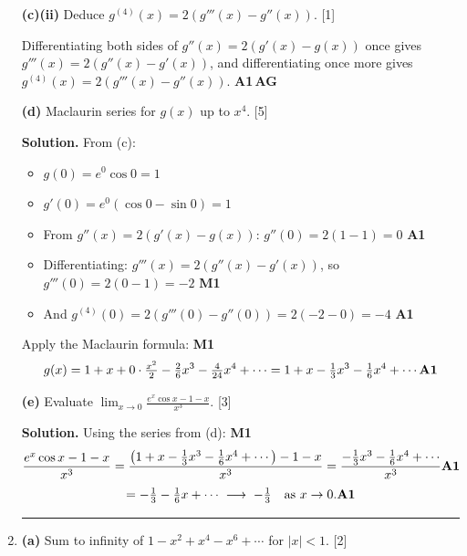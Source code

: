 \documentclass[12pt, twoside]{article}
\begin{document}
\begin{enumerate}[itemsep=0.3cm]
\medskip

\textbf{(c)(ii)} Deduce $g^{(4)}(x) = 2(g'''(x) - g''(x))$. \hfill [1]

Differentiating both sides of $g''(x) = 2(g'(x) - g(x))$ once gives
$g'''(x) = 2(g''(x) - g'(x))$, and differentiating once more gives
$g^{(4)}(x) = 2(g'''(x) - g''(x))$. \hfill \textbf{A1\,AG}

\medskip

\textbf{(d)} Maclaurin series for $g(x)$ up to $x^4$. \hfill [5]

\textbf{Solution.} From (c):
\begin{itemize}\setlength\itemsep{0.1em}
  \item $g(0) = e^0 \cos 0 = 1$
  \item $g'(0) = e^0(\cos 0 - \sin 0) = 1$
  \item From $g''(x) = 2(g'(x) - g(x))$: $g''(0) = 2(1 - 1) = 0$
    \hfill \textbf{A1}
  \item Differentiating: $g'''(x) = 2(g''(x) - g'(x))$, so
    $g'''(0) = 2(0 - 1) = -2$ \hfill \textbf{M1}
  \item And $g^{(4)}(0) = 2(g'''(0) - g''(0)) = 2(-2 - 0) = -4$
    \hfill \textbf{A1}
\end{itemize}
Apply the Maclaurin formula: \hfill \textbf{M1}
\[
g(x) = 1 + x + 0 \cdot \tfrac{x^2}{2} - \tfrac{2}{6}x^3 - \tfrac{4}{24}x^4
+ \cdots = 1 + x - \tfrac{1}{3}x^3 - \tfrac{1}{6}x^4 + \cdots
\hfill \textbf{A1}
\]

\medskip

\textbf{(e)} Evaluate
$\displaystyle\lim_{x \to 0} \frac{e^x \cos x - 1 - x}{x^3}$. \hfill [3]

\textbf{Solution.} Using the series from (d): \hfill \textbf{M1}
\[
\frac{e^x \cos x - 1 - x}{x^3}
= \frac{\left(1 + x - \tfrac{1}{3}x^3 - \tfrac{1}{6}x^4 + \cdots\right) - 1 - x}{x^3}
= \frac{-\tfrac{1}{3}x^3 - \tfrac{1}{6}x^4 + \cdots}{x^3} \hfill \textbf{A1}
\]
\[
= -\tfrac{1}{3} - \tfrac{1}{6}x + \cdots \;\longrightarrow\; -\tfrac{1}{3}
\quad\text{as } x \to 0. \hfill \textbf{A1}
\]

\bigskip
\hrule
\bigskip

\item[5.] 

\textbf{(a)} Sum to infinity of $1 - x^2 + x^4 - x^6 + \cdots$ for $|x| < 1$.
\hfill [2]


\end{enumerate}
\end{document}
